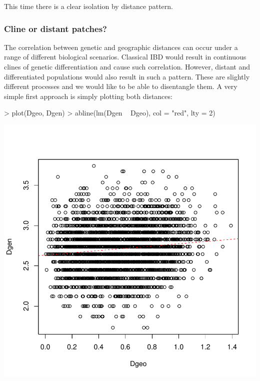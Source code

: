 \documentclass{article}
\begin{document}
\noindent This time there is a clear isolation by distance pattern.


\subsubsection{Cline or distant patches?}
The correlation between genetic and geographic distances can occur under a range of different
biological scenarios.
Classical IBD would result in continuous clines of genetic differentiation and cause such correlation.
However, distant and differentiated populations would also result in such a pattern.
These are slightly different processes and we would like to be able to disentangle them.
A very simple first approach is simply plotting both distances:
\begin{Schunk}
\begin{Sinput}
> plot(Dgeo, Dgen)
> abline(lm(Dgen ~ Dgeo), col = "red", lty = 2)
\end{Sinput}
\end{Schunk}
\includegraphics{figs/base-083}
\end{document}
